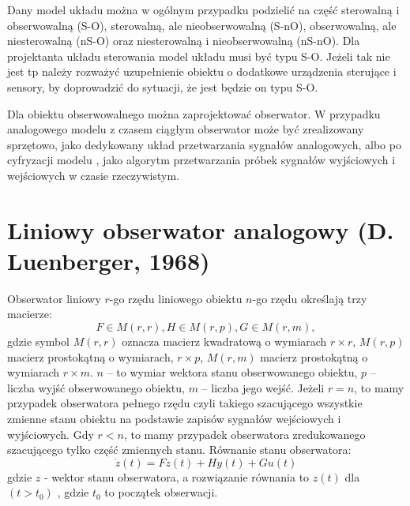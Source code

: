 \documentclass{article}
\begin{document}
		Dany model układu można w ogólnym przypadku podzielić na część sterowalną i
		obserwowalną (S-O), sterowalną, ale nieobserwowalną (S-nO), obserwowalną, ale
		niesterowalną (nS-O) oraz niesterowalną i nieobserwowalną (nS-nO). Dla projektanta
		układu sterowania model układu musi być typu S-O. Jeżeli tak nie jest tp należy rozważyć
		uzupełnienie obiektu o dodatkowe urządzenia sterujące i sensory, by doprowadzić do
		sytuacji, że jest będzie on typu S-O.

		Dla obiektu obserwowalnego można zaprojektować obserwator. W przypadku
		analogowego modelu z czasem ciągłym obserwator może być zrealizowany sprzętowo,
		jako dedykowany układ przetwarzania sygnałów analogowych, albo po cyfryzacji modelu
		, jako algorytm przetwarzania próbek sygnałów wyjściowych i wejściowych w czasie rzeczywistym.

		\section{Liniowy obserwator analogowy (D. Luenberger, 1968)}

		Obserwator liniowy $r$-go rzędu liniowego obiektu $n$-go rzędu określają trzy macierze:
		\begin{equation}
			F \in M(r, r), H \in M(r, p), G \in M(r, m),
		\end{equation}
		gdzie symbol $M(r, r)$ oznacza macierz kwadratową o wymiarach $r \times r$, $M(r, p)$ macierz
		prostokątną o wymiarach, $r \times p$, $M(r, m)$ macierz prostokątną o wymiarach $r \times m$.
		$n$ – to wymiar wektora stanu obserwowanego obiektu, $p$ – liczba wyjść obserwowanego
		obiektu, $m$ – liczba jego wejść.
		Jeżeli $r = n$, to mamy przypadek obserwatora pełnego rzędu czyli takiego 
		szacującego wszystkie
		zmienne stanu obiektu na podstawie zapisów sygnałów wejściowych i wyjściowych.
		Gdy $r < n$, to mamy przypadek obserwatora zredukowanego szacującego tylko część zmiennych stanu.
		Równanie stanu obserwatora:
		\begin{equation}
			\dot{z}(t) = F z(t) + H y(t) + G u(t)
		\end{equation}
		gdzie $z$ - wektor stanu obserwatora, a rozwiązanie równania to $z(t)$ dla $(t > t_0)$ , gdzie $t_0$ to
		początek obserwacji.
\end{document}
